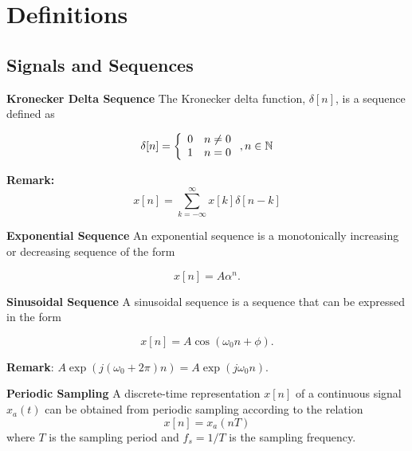 \chapter{Definitions}


\section{Signals and Sequences}

\begin{defn}{\textbf{Kronecker Delta Sequence}}
    The Kronecker delta function, $\delta[n]$, is a sequence defined as

    \begin{equation}
        \delta [n] = \left\{ {\begin{array}{*{20}{c}}
            0&{n \ne 0}\\
            1&{n = 0}
            \end{array}} \right.,n \in \bN
    \end{equation}
\end{defn}
\textbf{Remark:}
\begin{equation}
    x[n] = \sum\limits_{k =  - \infty }^\infty  {x[k]\delta [n - k]} 
\end{equation}

\begin{defn}{\textbf{Exponential Sequence}}
    An exponential sequence is a monotonically increasing or decreasing sequence of the form

    \begin{equation}
        x[n] = A \alpha ^ n.        
    \end{equation}
\end{defn}

\begin{defn}{\textbf{Sinusoidal Sequence}}
    A sinusoidal sequence is a sequence that can be expressed in the form

    \begin{equation}
        x[n] = A \cos (\omega_0 n + \phi).  
    \end{equation}
\end{defn}

\textbf{Remark}: $A \exp(j(\omega_0+2\pi)n) = A \exp(j \omega_0 n)$.



\begin{defn}{\textbf{Periodic Sampling}}
A discrete-time representation $x[n]$ of a continuous signal $x_a(t)$ can be obtained from periodic sampling according to the relation
\begin{equation}
x[n] = x_a(nT)
\end{equation}
where $T$ is the sampling period and $f_s=1/T$ is the sampling frequency.
\end{defn}

